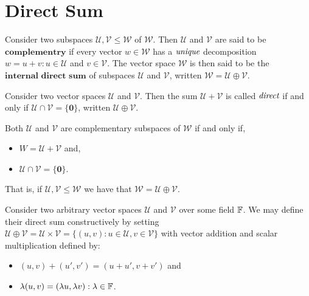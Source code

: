 \section{Direct Sum} %
\label{sec:directsum}

Consider two subspaces $\mathcal{U},\mathcal{V} \leq \mathcal{W}$
of $\mathcal{W}$. Then $\mathcal{U}$ and $\mathcal{V}$ are said to be
$\textbf{complementry}$ if every vector $w \in \mathcal{W}$ has a
$\emph{unique}$ decomposition $w=u+v : u \in \mathcal{U}$
and $v \in \mathcal{V}$. The vector space $\mathcal{W}$ is then said to
be the $\textbf{internal direct sum}$ of subspaces $\mathcal{U}$
and $\mathcal{V}$, written $\mathcal{W} = \mathcal{U} \oplus \mathcal{V}$.

\begin{defn}
	Consider two vector spaces $\mathcal{U}$ and $\mathcal{V}$.
	Then the sum $\mathcal{U} + \mathcal{V}$ is called $\emph{direct}$
	if and only if $\mathcal{U} \cap \mathcal{V} = \{ \mathbf{0} \}$,
	written $\mathcal{U} \oplus \mathcal{V}$.
\end{defn}

\begin{defn}
	Both $\mathcal{U}$ and $\mathcal{V}$ are complementary subspaces
	of $\mathcal{W}$ if and only if,
	\begin{itemize}
		\item $W = \mathcal{U} + \mathcal{V}$ and,
		\item $\mathcal{U} \cap \mathcal{V} = \{ \mathbf{0} \}$.
	\end{itemize}
	That is, if $\mathcal{U},\mathcal{V} \leq \mathcal{W}$ we have that
	$\mathcal{W} = \mathcal{U} \oplus \mathcal{V}$.
\end{defn}

\begin{defn}
	Consider two arbitrary vector spaces $\mathcal{U}$ and $\mathcal{V}$
	over some field $\mathbb{F}$. We may define their direct sum constructively
	by setting $\mathcal{U} \oplus \mathcal{V}
	= \mathcal{U} \times \mathcal{V}
	= \{ (u,v) : u \in \mathcal{U}, v \in \mathcal{V} \}$ with vector
	addition and scalar multiplication defined by:
	\begin{itemize}
		\item $(u,v)+(u',v')=(u+u',v+v')$ and
		\item $\lambda (u,v) = ( \lambda u, \lambda v) : \lambda \in \mathbb{F}$.
	\end{itemize}
\end{defn}

